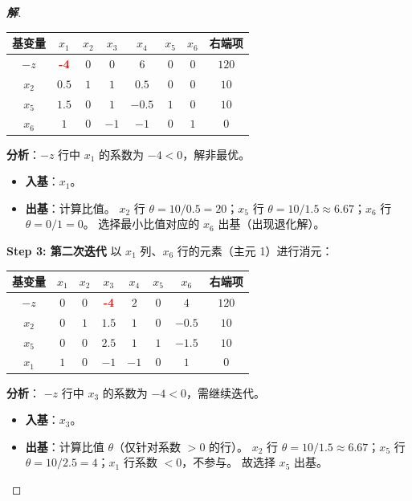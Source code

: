 \documentclass[a4paper,12pt]{ctexart} %
\newenvironment{solution}{\begin{proof}[\textbf{解}]}{\end{proof}}
\begin{document}
\begin{solution}
		\begin{table}[H]
			\centering
			\renewcommand{\arraystretch}{1.3}
			\begin{tabular}{c|cccccc|c}
				\toprule
				\textbf{基变量} & $x_1$ & $x_2$ & $x_3$ & $x_4$ & $x_5$ & $x_6$ & \textbf{右端项} \\
				\hline
				$-z$ & \textcolor{red}{\textbf{-4}} & $0$ & $0$ & $6$ & $0$ & $0$ & $120$ \\
				\hline
				$x_2$ & $0.5$ & $1$ & $1$ & $0.5$ & $0$ & $0$ & $10$ \\
				$x_5$ & $1.5$ & $0$ & $1$ & $-0.5$ & $1$ & $0$ & $10$ \\
				$x_6$ & $1$ & $0$ & $-1$ & $-1$ & $0$ & $1$ & $0$ \\
				\bottomrule
			\end{tabular}
		\end{table}
		
		\textbf{分析}：$-z$ 行中 $x_1$ 的系数为 $-4 < 0$，解非最优。
		\begin{itemize}
			\item \textbf{入基}：\textbf{$x_1$}。
			\item \textbf{出基}：计算比值。
			$x_2$ 行 $\theta=10/0.5=20$；$x_5$ 行 $\theta=10/1.5\approx 6.67$；$x_6$ 行 $\theta=0/1=0$。
			选择最小比值对应的 \textbf{$x_6$} 出基（出现退化解）。
		\end{itemize}
		
		\textbf{Step 3: 第二次迭代}
		以 $x_1$ 列、$x_6$ 行的元素（主元 1）进行消元：
		
		\begin{table}[H]
			\centering
			\renewcommand{\arraystretch}{1.3}
			\begin{tabular}{c|cccccc|c}
				\toprule
				\textbf{基变量} & $x_1$ & $x_2$ & $x_3$ & $x_4$ & $x_5$ & $x_6$ & \textbf{右端项} \\
				\hline
				$-z$ & $0$ & $0$ & \textcolor{red}{\textbf{-4}} & $2$ & $0$ & $4$ & $120$ \\
				\hline
				$x_2$ & $0$ & $1$ & $1.5$ & $1$ & $0$ & $-0.5$ & $10$ \\
				$x_5$ & $0$ & $0$ & $2.5$ & $1$ & $1$ & $-1.5$ & $10$ \\
				$x_1$ & $1$ & $0$ & $-1$ & $-1$ & $0$ & $1$ & $0$ \\
				\bottomrule
			\end{tabular}
		\end{table}
		
		\textbf{分析}：
		$-z$ 行中 $x_3$ 的系数为 $-4 < 0$，需继续迭代。
		\begin{itemize}
			\item \textbf{入基}：\textbf{$x_3$}。
			\item \textbf{出基}：计算比值 $\theta$（仅针对系数 $>0$ 的行）。
			$x_2$ 行 $\theta=10/1.5 \approx 6.67$；$x_5$ 行 $\theta=10/2.5=4$；$x_1$ 行系数 $<0$，不参与。
			故选择 \textbf{$x_5$} 出基。
		\end{itemize}
		

\end{solution}
\end{document}
